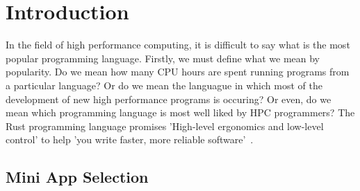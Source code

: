 \chapter{Introduction}
In the field of high performance computing, it is difficult to say what is the most popular programming language. Firstly, we must define what we mean by popularity. Do we mean how many CPU hours are spent running programs from a particular language? Or do we mean the languague in which most of the development of new high performance programs is occuring? Or even, do we mean which programming language is most well liked by HPC programmers?
The Rust programming language promises 'High-level ergonomics and low-level control' to help 'you write faster, more reliable software'~\cite{RustBook}.

\section{Mini App Selection}
